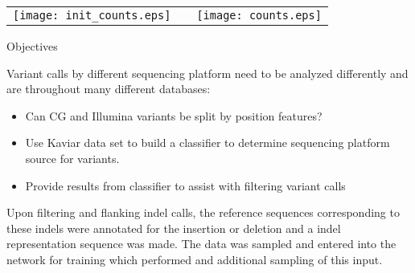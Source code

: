 \begin{center}
\begin{tabular}{ccc}
\texttt{[image: init\_counts.eps]} & \hfill & \texttt{[image: counts.eps]}
\end{tabular}
\end{center}

\begin{alertblock}{Objectives}

Variant calls by different sequencing platform need to be analyzed differently and are throughout many different databases:
\begin{itemize}
\item Can CG and Illumina variants be split by position features?
\item Use Kaviar data set to build a classifier to determine sequencing platform source for variants.
\item Provide results from classifier to assist with filtering variant calls  
\end{itemize}

\end{alertblock}

Upon filtering and flanking indel calls, the reference sequences corresponding to these indels were annotated for the insertion or deletion and a indel representation sequence was made. The data was sampled and entered into the network for training which performed and additional sampling of this input.